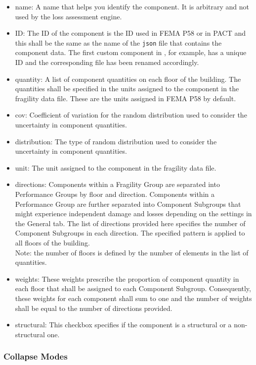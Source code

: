\begin{itemize}
    \item name: A name that helps you identify the component. It is arbitrary and not used by the loss assessment engine.
    \item ID: The ID of the component is the ID used in FEMA P58 or in PACT and this shall be the same as the name of the \texttt{json} file that contains the component data. The first custom component in , for example, has a unique ID and the corresponding file has been renamed accordingly.
    \item quantity: A list of component quantities on each floor of the building. The quantities shall be specified in the units assigned to the component in the fragility data file. These are the units assigned in FEMA P58 by default.
    \item cov: Coefficient of variation for the random distribution used to consider the uncertainty in component quantities.
    \item distribution: The type of random distribution used to consider the uncertainty in component quantities.
    \item unit: The unit assigned to the component in the fragility data file.
    \item directions: Components within a Fragility Group are separated into Performance Groups by floor and direction. Components within a Performance Group are further separated into Component Subgroups that might experience independent damage and losses depending on the settings in the General tab. The list of directions provided here specifies the number of Component Subgroups in each direction. The specified pattern is applied to all floors of the building.\\
    Note: the number of floors is defined by the number of elements in the list of quantities.
    \item weights: These weights prescribe the proportion of component quantity in each floor that shall be assigned to each Component Subgroup. Consequently, these weights for each component shall sum to one and the number of weights shall be equal to the number of directions provided.
    \item structural: This checkbox specifies if the component is a structural or a non-structural one.
\end{itemize}

\subsubsection{Collapse Modes}

